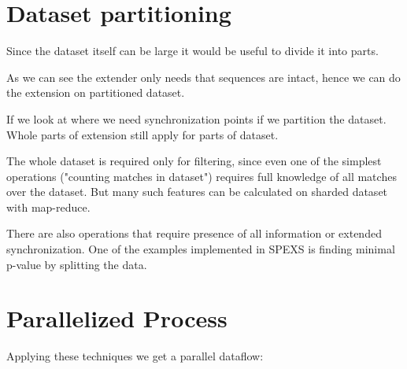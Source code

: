 
\section{Dataset partitioning}

Since the dataset itself can be large it would be useful to divide it into parts. 

As we can see the extender only needs that sequences are intact, hence we can do the extension on partitioned dataset.

If we look at where we need synchronization points if we partition 
the dataset. Whole parts of extension still apply for parts of dataset.

The whole dataset is required only for filtering, since even one of the simplest operations ("counting matches in dataset") requires full knowledge of all matches over the dataset. But many such features can be calculated on sharded dataset with map-reduce.


There are also operations that require presence of all information or extended synchronization. One of the examples implemented in SPEXS is finding minimal p-value by splitting the data.


\section{Parallelized Process}

Applying these techniques we get a parallel dataflow:

